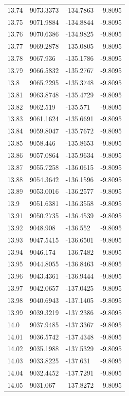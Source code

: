 \begin{table}[H]
\begin{tabular}{llll}
13.74 & 9073.3373 & -134.7863 & -9.8095 \\
13.75 & 9071.9884 & -134.8844 & -9.8095 \\
13.76 & 9070.6386 & -134.9825 & -9.8095 \\
13.77 & 9069.2878 & -135.0805 & -9.8095 \\
13.78 & 9067.936 & -135.1786 & -9.8095 \\
13.79 & 9066.5832 & -135.2767 & -9.8095 \\
13.8 & 9065.2295 & -135.3748 & -9.8095 \\
13.81 & 9063.8748 & -135.4729 & -9.8095 \\
13.82 & 9062.519 & -135.571 & -9.8095 \\
13.83 & 9061.1624 & -135.6691 & -9.8095 \\
13.84 & 9059.8047 & -135.7672 & -9.8095 \\
13.85 & 9058.446 & -135.8653 & -9.8095 \\
13.86 & 9057.0864 & -135.9634 & -9.8095 \\
13.87 & 9055.7258 & -136.0615 & -9.8095 \\
13.88 & 9054.3642 & -136.1596 & -9.8095 \\
13.89 & 9053.0016 & -136.2577 & -9.8095 \\
13.9 & 9051.6381 & -136.3558 & -9.8095 \\
13.91 & 9050.2735 & -136.4539 & -9.8095 \\
13.92 & 9048.908 & -136.552 & -9.8095 \\
13.93 & 9047.5415 & -136.6501 & -9.8095 \\
13.94 & 9046.174 & -136.7482 & -9.8095 \\
13.95 & 9044.8055 & -136.8463 & -9.8095 \\
13.96 & 9043.4361 & -136.9444 & -9.8095 \\
13.97 & 9042.0657 & -137.0425 & -9.8095 \\
13.98 & 9040.6943 & -137.1405 & -9.8095 \\
13.99 & 9039.3219 & -137.2386 & -9.8095 \\
14.0 & 9037.9485 & -137.3367 & -9.8095 \\
14.01 & 9036.5742 & -137.4348 & -9.8095 \\
14.02 & 9035.1988 & -137.5329 & -9.8095 \\
14.03 & 9033.8225 & -137.631 & -9.8095 \\
14.04 & 9032.4452 & -137.7291 & -9.8095 \\
14.05 & 9031.067 & -137.8272 & -9.8095 \\

\end{tabular}
\end{table}
